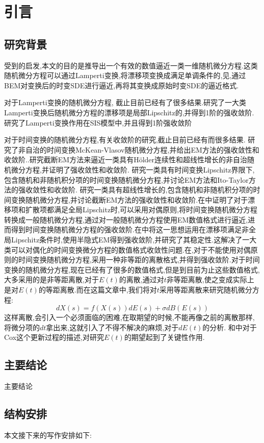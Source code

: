 

\chapter{引言}\label{chap:Intro}

\section{研究背景}\label{sec:background}




受到\cite{Alfonsi2013602}的启发,本文的目的是推导出一个有效的数值逼近一类一维随机微分方程.这类随机微分方程可以通过Lamperti变换,将漂移项变换成满足单调条件的,见\cite{iacus2008simulation},通过BEM对变换后的时变SDE进行逼近,再将其变换成原始时变SDE的逼近格式.

对于Lamperti变换的随机微分方程, 截止目前已经有了很多结果.\cite{neuenkirch2014first}研究了一大类Lamperti变换后随机微分方程的漂移项是局部Lipschitz的,并得到1阶的强收敛阶. \cite{yang2021first}研究了Lamperti变换作用在SIS模型中,并且得到1阶强收敛阶

对于时间变换的随机微分方程,有关收敛阶的研究,截止目前已经有而很多结果.\cite{wen2023strong}
研究了非自治的时间变换McKean-Vlasov随机微分方程,并给出EM方法的强收敛性和收敛阶.\cite{liu2020truncated}.研究截断EM方法来逼近一类具有Hölder连续性和超线性增长的非自治随机微分方程,并证明了强收敛性和收敛阶.\cite{jin2021strong}
研究一类具有时间变换Lipschitz界限下,包含随机和非随机积分项的时间变换随机微分方程,并讨论EM方法和Ito-Taylor方法的强收敛性和收敛阶.\cite{li2023convergence}
研究一类具有超线性增长的,包含随机和非随机积分项的时间变换随机微分方程,并讨论截断EM方法的强收敛性和收敛阶.在\cite{jum2014strong}中证明了对于漂移项和扩散项都满足全局Lipschitz时,可以采用对偶原则,将时间变换随机微分方程转换成一般随机微分方程,通过对一般随机微分方程使用EM数值格式进行逼近,进而得到时间变换随机微分方程的强收敛阶.在\cite{deng2020semi}中将这一思想运用在漂移项满足非全局Lipschitz条件时,使用半隐式EM得到强收敛阶,并研究了其稳定性.这解决了一大类可以对偶化的时间变换微分方程的数值格式收敛性问题.在\cite{jin2019strong},对于不能使用对偶原则的时间变换随机微分方程,采用一种非等距的离散格式,并得到强收敛阶.对于时间变换的随机微分方程,现在已经有了很多的数值格式,但是到目前为止这些数值格式,大多采用的是非等距离散,对于$E(t)$的离散,通过对$t$非等距离散,使之变成实际上是对$E(t)$的等距离散.而在这篇文章中,我们将对$t$采用等距离散来研究随机微分方程:
\begin{equation}\label{basic SDE}
	dX(s)=f(X(s))dE(s)+\sigma dB(E(s))
\end{equation}
这样离散,会引入一个必须面临的困难,在取期望的时候,不能再像之前的离散那样,将微分项的$dt$拿出来,这就引入了不得不解决的麻烦,对于$dE(t)$的分析.
\cite{daley2003introduction}和\cite{magdziarz2009stochastic}中对于Cox这个更新过程的描述,对研究$E(t)$的期望起到了关键性作用.


\section{主要结论}\label{sec:mainResults}

主要结论


\section{结构安排}

本文接下来的写作安排如下:


